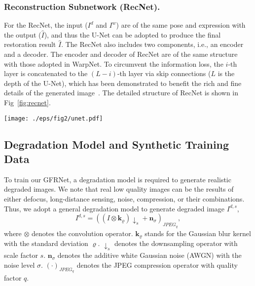 \documentclass[runningheads]{llncs}
\begin{document}
\subsubsection{Reconstruction Subnetwork (RecNet).}

For the RecNet, the input ($I^d$ and $I^{w}$) are of the same pose and expression with the output ($\hat{I}$), and thus the U-Net can be adopted to produce the final restoration result $\hat{I}$.
The RecNet also includes two components, i.e., an encoder and a decoder.
The encoder and decoder of RecNet are of the same structure with those adopted in WarpNet.
To circumvent the information loss, the $i$-{th} layer is concatenated to the $(L-i)$-{th} layer via skip connections ($L$ is the depth of the U-Net), which has been demonstrated to benefit the rich and fine details of the generated image~\cite{pix2pix2016}. The detailed structure of RecNet is shown in Fig~\ref{fig:recnet}.
\begin{figure*}[htb]
\setlength{\abovecaptionskip}{-1ex}
\setlength{\belowcaptionskip}{-2ex}
\begin{center}
\texttt{[image: ./eps/fig2/unet.pdf]}
\end{center}
   \caption{Architecture of our RecNet. It takes $I^w$ and $I^d$ as input to produce the restoration result $\hat{I}$. Reconstruction loss and global adversarial loss are adopted across entire image (labeled in \textcolor[RGB]{112,48,160}{\textbf{purple}}), while local adversarial loss is adopted across face region (labeled in \textcolor[RGB]{0,176,80}{\textbf{green}}).}
   \label{fig:recnet}
\end{figure*}
\subsection{Degradation Model and Synthetic Training Data}
To train our GFRNet, a degradation model is required to generate realistic degraded images.
We note that real low quality images can be the results of either defocus, long-distance sensing, noise, compression, or their combinations.
Thus, we adopt a general degradation model to generate degraded image $I^{d,s}$,
\begin{equation}
\label{eqn:degradation}
I^{d,s} = {\left( {\left( {I \otimes \mathbf{k}_{\varrho}} \right){ \downarrow _s} + \mathbf{n}_{\sigma}} \right)_{JPEG_q}},
\end{equation}
where $\otimes$ denotes the convolution operator.
$\mathbf{k}_{\varrho}$ stands for the Gaussian blur kernel with the standard deviation ${\varrho}$.
$\downarrow _s$ denotes the downsampling operator with scale factor $s$.
$\mathbf{n}_{\sigma}$ denotes the additive white Gaussian noise (AWGN) with the noise level $\sigma$.
$(\cdot)_{JPEG_q}$ denotes the JPEG compression operator with quality factor $q$.
\end{document}
